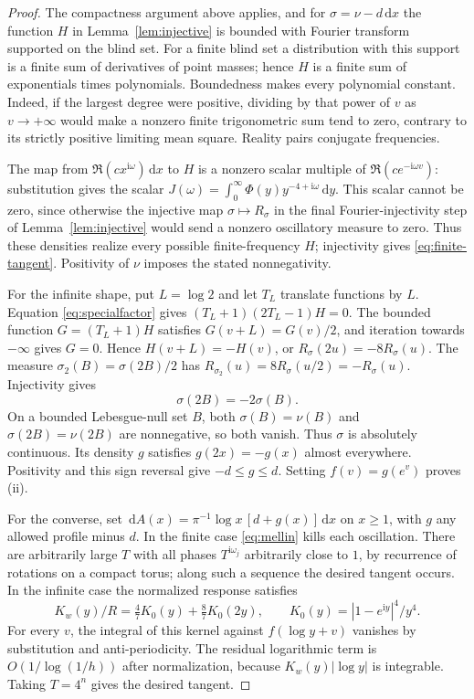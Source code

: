 \documentclass[11pt]{article}
\theoremstyle{definition}\newtheorem{definition}[theorem]{Definition}
\theoremstyle{remark}\newtheorem{remark}[theorem]{Remark}
\newcommand{\dd}{\,\mathrm d}\newcommand{\ii}{\mathrm i}
\begin{document}
\begin{proof}
The compactness argument above applies, and for $\sigma=\nu-d\dd x$
the function $H$ in Lemma~\ref{lem:injective} is bounded with Fourier
transform supported on the blind set.
For a finite blind set a distribution with this support is a finite sum
of derivatives of point masses; hence $H$ is a finite sum of exponentials
times polynomials. Boundedness makes every polynomial constant. Indeed,
if the largest degree were positive, dividing by that power of $v$ as
$v\to+\infty$ would make a nonzero finite trigonometric sum tend to zero,
contrary to its strictly positive limiting mean square.
Reality pairs conjugate frequencies.

The map from $\Re(c x^{\ii\omega})\dd x$ to $H$ is a nonzero scalar
multiple of $\Re(c e^{-\ii\omega v})$: substitution gives the scalar
$J(\omega)=\int_0^\infty\Phi(y)y^{-4+\ii\omega}\dd y$.
This scalar cannot be zero, since otherwise the injective map
$\sigma\mapsto R_\sigma$ in the final Fourier-injectivity step of
Lemma~\ref{lem:injective} would send a
nonzero oscillatory measure to zero. Thus these densities realize every
possible finite-frequency $H$; injectivity gives \eqref{eq:finite-tangent}.
Positivity of $\nu$ imposes the stated nonnegativity.

For the infinite shape, put $L=\log2$ and let $T_L$ translate functions
by $L$. Equation \eqref{eq:specialfactor} gives
$(T_L+1)(2T_L-1)H=0$. The bounded function $G=(T_L+1)H$
satisfies $G(v+L)=G(v)/2$, and iteration towards $-\infty$ gives $G=0$.
Hence $H(v+L)=-H(v)$, or $R_\sigma(2u)=-8R_\sigma(u)$.
The measure $\sigma_2(B)=\sigma(2B)/2$ has
$R_{\sigma_2}(u)=8R_\sigma(u/2)=-R_\sigma(u)$.
Injectivity gives
\begin{equation}\label{eq:anti-measure}
 \sigma(2B)=-2\sigma(B).
\end{equation}
On a bounded Lebesgue-null set $B$, both $\sigma(B)=\nu(B)$ and
$\sigma(2B)=\nu(2B)$ are nonnegative, so both vanish.
Thus $\sigma$ is absolutely continuous. Its density $g$ satisfies
$g(2x)=-g(x)$ almost everywhere. Positivity and this sign reversal give
$-d\le g\le d$. Setting $f(v)=g(e^v)$ proves (ii).

For the converse, set $\dd A(x)=\pi^{-1}\log x\,[d+g(x)]\dd x$
on $x\ge1$, with $g$ any allowed profile minus $d$.
In the finite case \eqref{eq:mellin} kills each oscillation.
There are arbitrarily large $T$ with all phases $T^{\ii\omega_j}$
arbitrarily close to $1$, by recurrence of rotations on a compact torus;
along such a sequence the desired tangent occurs.
In the infinite case the normalized response satisfies
\begin{equation}\label{eq:kernel-special}
 K_w(y)/R=\tfrac47K_0(y)+\tfrac87K_0(2y),
 \qquad K_0(y)=|1-e^{\ii y}|^4/y^4.
\end{equation}
For every $v$, the integral of this kernel against $f(\log y+v)$
vanishes by substitution and anti-periodicity. The residual logarithmic
term is $O(1/\log(1/h))$ after normalization, because
$K_w(y)|\log y|$ is integrable. Taking $T=4^n$ gives the desired tangent.
\end{proof}
\end{document}
